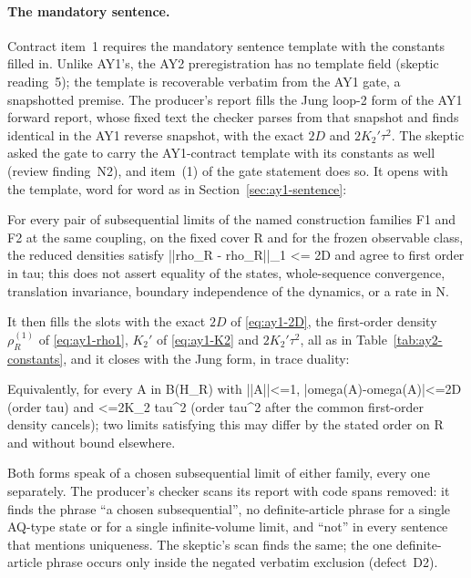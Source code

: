 \paragraph{The mandatory sentence.}
Contract item~1 requires the mandatory sentence template with the constants
filled in. Unlike AY1's, the AY2 preregistration has no template field
(skeptic reading~5); the template is recoverable verbatim from the AY1 gate, a
snapshotted premise. The producer's report fills the Jung loop-2 form of the
AY1 forward report, whose fixed text the checker parses from that snapshot and
finds identical in the AY1 reverse snapshot, with the exact $2D$ and
$2K_2'\tau^2$. The skeptic asked the gate to carry the AY1-contract template
with its constants as well (review finding~N2), and item~(1) of the gate
statement does so. It opens with the template, word for word as in
Section~\ref{sec:ay1-sentence}:
\begin{gatequote}
For every pair of subsequential limits of the named construction families F1
and F2 at the same coupling, on the fixed cover R and for the frozen
observable class, the reduced densities satisfy ||rho\_R -
rho\textquotesingle{}\_R||\_1 <= 2D and agree to first order in tau; this does
not assert equality of the states, whole-sequence convergence, translation
invariance, boundary independence of the dynamics, or a rate in N.
\end{gatequote}
It then fills the slots with the exact $2D$ of \eqref{eq:ay1-2D}, the
first-order density $\rho^{(1)}_R$ of \eqref{eq:ay1-rho1}, $K_2'$ of
\eqref{eq:ay1-K2} and $2K_2'\tau^2$, all as in Table~\ref{tab:ay2-constants},
and it closes with the Jung form, in trace duality:
\begin{gatequote}
Equivalently, for every A in B(H\_R) with ||A||<=1,
|omega\textquotesingle{}(A)-omega\textquotesingle{}\textquotesingle{}(A)|<=2D
(order tau) and <=2K\_2\textquotesingle{} tau\textasciicircum{}2 (order
tau\textasciicircum{}2 after the common first-order density cancels); two
limits satisfying this may differ by the stated order on R and without bound
elsewhere.
\end{gatequote}
Both forms speak of a chosen subsequential limit of either family, every one
separately. The producer's checker scans its report with code spans removed:
it finds the phrase ``a chosen subsequential'', no definite-article phrase for
a single AQ-type state or for a single infinite-volume limit, and
``not'' in every sentence that mentions uniqueness. The skeptic's scan finds
the same;
the one definite-article phrase occurs only inside the negated verbatim
exclusion (defect~D2).

